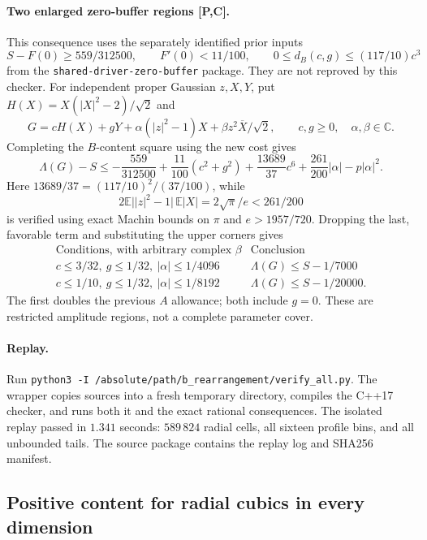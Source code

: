 \paragraph{Two enlarged zero-buffer regions [P,C].}
This consequence uses the separately identified prior inputs
\[
 S-F(0)\geq559/312500,\qquad F'(0)<11/100,\qquad
 0\leq d_B(c,g)\leq(117/10)c^3
\]
from the \texttt{shared-driver-zero-buffer} package.  They are not
reproved by this checker.  For independent proper Gaussian \(z,X,Y\),
put \(H(X)=X(|X|^2-2)/\sqrt2\) and
\[
 G=cH(X)+gY+\alpha(|z|^2-1)X+\beta z^2\overline X/\sqrt2,
 \qquad c,g\geq0,\quad\alpha,\beta\in\mathbb C.
\]
Completing the \(B\)-content square using the new cost gives
\[
 \Lambda(G)-S
 \leq-\frac{559}{312500}+\frac{11}{100}(c^2+g^2)
       +\frac{13689}{37}c^6+\frac{261}{200}|\alpha|-p|\alpha|^2.
\]
Here \(13689/37=(117/10)^2/(37/100)\), while
\[
 2\mathbb E\bigl||z|^2-1\bigr|\,\mathbb E|X|
       =2\sqrt\pi/e<261/200
\]
is verified using exact Machin bounds on \(\pi\) and
\(e>1957/720\).  Dropping the last, favorable term and substituting the
upper corners gives
\[
 \begin{array}{c|c}
 \text{Conditions, with arbitrary complex }\beta&\text{Conclusion}\\ \hline
 c\leq3/32,\ g\leq1/32,\ |\alpha|\leq1/4096
       &\Lambda(G)\leq S-1/7000\\
 c\leq1/10,\ g\leq1/32,\ |\alpha|\leq1/8192
       &\Lambda(G)\leq S-1/20000 .
 \end{array}
\]
The first doubles the previous \(A\) allowance; both include \(g=0\).
These are restricted amplitude regions, not a complete parameter cover.

\paragraph{Replay.}
Run \texttt{python3 -I /absolute/path/b\_rearrangement/verify\_all.py}.
The wrapper copies sources into a fresh temporary directory, compiles
the C++17 checker, and runs both it and the exact rational consequences.
The isolated replay passed in \(1.341\) seconds: \(589\,824\) radial cells,
all sixteen profile bins, and all unbounded tails.  The source package
contains the replay log and SHA256 manifest.

\subsection{Positive content for radial cubics in every dimension}
